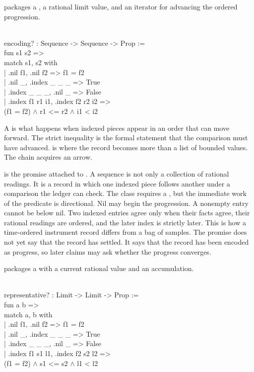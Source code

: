  packages a , a rational limit value, and an
iterator for advancing the ordered progression.

\begin{leancode}
\\
encoding? : Sequence -> Sequence -> Prop :=\\
\quad\quad fun s1 s2 =>\\
\quad\quad match s1, s2 with\\
\quad\quad | .nil f1, .nil f2 => f1 = f2\\
\quad\quad | .nil \_, .index \_ \_ \_ => True\\
\quad\quad | .index \_ \_ \_, .nil \_ => False\\
\quad\quad | .index f1 r1 i1, .index f2 r2 i2 =>\\
\quad\quad\quad (f1 = f2) \(\wedge\) r1 <= r2 \(\wedge\) i1 < i2
\end{leancode}

A  is what happens when indexed pieces appear in an order that
can move forward. The strict inequality  is the formal statement
that the comparison must have advanced.  is where the record
becomes more than a list of bounded values. The chain acquires an arrow.

 is the promise attached to . A sequence is not
only a collection of rational readings. It is a record in which one indexed
piece follows another under a comparison the ledger can check. The class
requires a , but the immediate work of the predicate is
directional. Nil may begin the progression. A nonempty entry cannot be below
nil. Two indexed entries agree only when their facts agree, their rational
readings are ordered, and the later index is strictly later. This is how a
time-ordered instrument record differs from a bag of samples. The promise does
not yet say that the record has settled. It says that the record has been
encoded as progress, so later claims may ask whether the progress converges.

 packages a  with a current rational value and
an accumulation.

\begin{leancode}
\\
representative? : Limit -> Limit -> Prop :=\\
\quad\quad fun a b =>\\
\quad\quad match a, b with\\
\quad\quad | .nil f1, .nil f2 => f1 = f2\\
\quad\quad | .nil \_, .index \_ \_ \_ => True\\
\quad\quad | .index \_ \_ \_, .nil \_ => False\\
\quad\quad | .index f1 s1 l1, .index f2 s2 l2 =>\\
\quad\quad\quad (f1 = f2) \(\wedge\) s1 <= s2 \(\wedge\) l1 < l2
\end{leancode}

